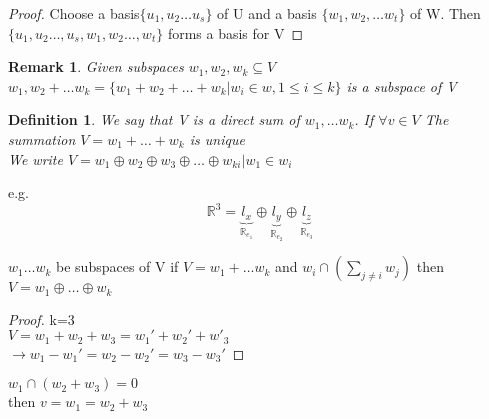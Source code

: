 \documentclass{article}
\newtheorem*{definition}{Definition}
\newtheorem*{remark}{Remark}
\newcommand{\R}{\mathbb{R}}
\newcommand{\brac}[1]{\{#1\}}
\newcommand{\op}{\oplus}
\newenvironment{lemma}[2][Lemma]{\begin{trivlist}
\item[\hskip \labelsep {\bfseries #1}\hskip \labelsep {\bfseries #2.}]}{\end{trivlist}}
\begin{document}
\begin{proof}
    Choose a basis$ \brac{u_1,u_2\dots u_s}$ of U and a basis $\brac{w_1,w_2,\dots w_t}$ of W. Then $\brac{u_1,u_2\dots,u_s,w_1,w_2\dots,w_t}$ forms a basis for V
\end{proof}
\begin{remark}
    Given subspaces $w_1,w_2,w_k \subseteq V$\\$w_1,w_2+\dots w_k=\brac{w_1+w_2+\dots+w_k|w_i\in w,1\leq i\leq k} $ is a subspace of V
\end{remark}
\begin{definition}
    We say that V is a direct sum of $w_1,\dots w_k$. If $\forall v \in V$ The summation $V=w_1+\dots+w_k$ is unique\\We write $V=w_1\op w_2\op w_3\op \dots \op w_{ki}|w_1\in w_i$
    
\end{definition}
e.g. $$\R^3 =\underbrace{l_x}_{\R_{e_1}} \op \underbrace{l_y}_{\R_{e_2}} \op \underbrace{l_z}_{\R_{e_3}}$$


\begin{theorem}
    $w_1\dots w_k$ be subspaces of V if $V=w_1+\dots w_k$ and $w_i \cap$$ (\sum_{j\neq i}w_j )$ then $V=w_1\op \dots \op w_k$
\end{theorem}
\begin{proof}
    k=3\\$V=w_1+w_2+w_3=w_1'+w_2'+w'_3$\\$\to w_1-w_1'=w_2-w_2'=w_3-w_3'$
\end{proof}
\begin{lemma}
    * $w_1 \cap (w_2+w_3)=0$\\ then $v=w_1=w_2+w_3$
    
\end{lemma}
\end{document}
